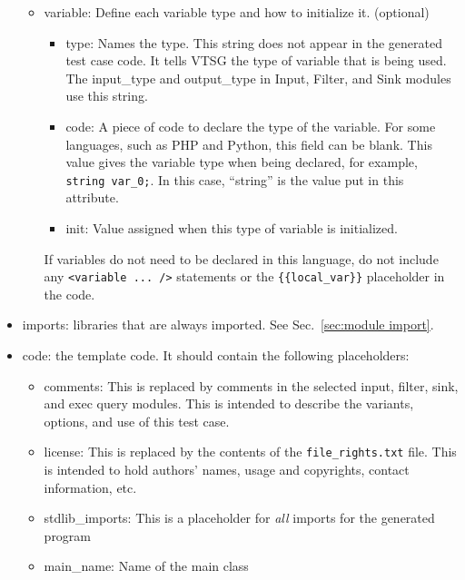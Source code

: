 \begin{itemize}
\begin{itemize}
        \item variable: Define each variable type and how to initialize it. (optional)
        \begin{itemize}
        \item type: Names the type. This string 
        does not appear in the generated test case code.  It tells VTSG
        the type of variable that is being used.  The input\_type
        and output\_type in Input, Filter, and Sink modules use
        this string.

        \item code: A piece of code to declare the type of the variable. For
        some languages, such as PHP and Python, this field can be blank. 
        This value gives the variable type when being declared, for example,
        \verb|string var_0;|.  In this case, ``string''
        is the value put in this attribute.

        \item init: Value assigned when this type of variable is initialized.
        \end{itemize}
        If variables do not need to be declared in this language, do not include
        any \verb|<variable ... />| statements or the \verb|{{local_var}}|
        placeholder in the code.
    \end{itemize}
    
    \item imports: libraries that are always imported.  See Sec.~\ref{sec:module import}.

    \item code: the template code. It should contain the 
    following placeholders:
    \begin{itemize}
        \item comments: This is replaced by comments in the selected input,
        filter, sink, and exec query modules.  This is intended to
        describe the variants, options, and use of this test case. 
        
        \item license: This is replaced by the contents of the
        \verb|file_rights.txt| file.  This is intended to hold
        authors' names, usage and copyrights, contact information, 
        etc.
        
        \item stdlib\_imports:  This is a placeholder for
        \emph{all} imports for the generated program

        \item main\_name:  Name of the main class


\end{itemize}
\end{itemize}
